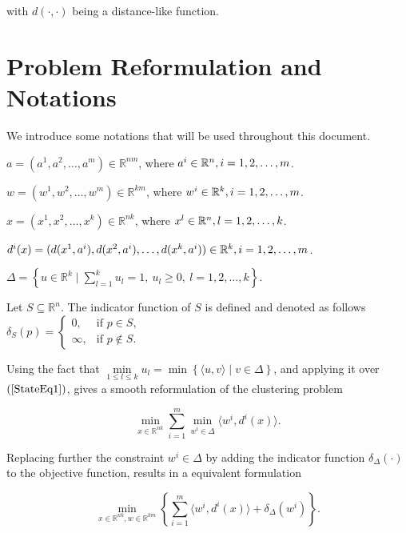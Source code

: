 \documentclass[11pt]{article}
\numberwithin{equation}{section}
\begin{document}
\noindent with $\textit{d}(\cdot ,\cdot)$ being a distance-like function.


\section{Problem Reformulation and Notations}

We introduce some notations that will be used throughout this document.

\noindent $a = (a^1, a^2, \ldots , a^m) \in \mathbb{R}^{nm}$, where $a^i \in \mathbb{R}^n,\smallskip i=1, 2, \ldots , m$.

\noindent $w = (w^1, w^2, \ldots , w^m) \in \mathbb{R}^{km}$, where $w^i \in \mathbb{R}^k,\smallskip i=1, 2, \ldots , m$.

\noindent $x = (x^1, x^2, \ldots , x^k) \in \mathbb{R}^{nk}$, where $x^l \in \mathbb{R}^n,\smallskip l=1, 2, \ldots , k$.

\noindent $d^{i}(x) = (d(x^1,a^i), d(x^2,a^i), \ldots , d(x^k,a^i)) \in \mathbb{R}^k,\smallskip i=1, 2, \ldots , m$.

\noindent $\Delta = \left\lbrace u \in \mathbb{R}^k \mid \sum\limits_{l=1}^{k} u_l = 1, \: u_l \geq 0 , \: l=1, 2, \ldots ,k \right\rbrace$.

\noindent Let $S \subseteq \mathbb{R}^n$. The indicator function of $S$ is defined and denoted as follows $\delta_S(p) = \begin{cases} 0, &\mbox{if } p \in S, \\ 
\infty, &\mbox{if } p \not\in S. \end{cases}$

Using the fact that $\min\limits_{1 \leq l \leq k} u_l = \min \left\lbrace \langle u,v \rangle \mid v \in \Delta \right\rbrace$, and applying it over $\left(\ref{StateEq1}\right)$, gives a smooth reformulation of the clustering problem

\begin{equation}
	\min\limits_{x \in \mathbb{R}^{nk}} \sum\limits_{i=1}^{m} \min\limits_{w^i \in \Delta} \langle w^i , d^i(x) \rangle. \label{StateEq2}
\end{equation}

Replacing further the constraint $w^i \in \Delta$ by adding the indicator function $\delta_{\Delta}(\cdot)$ to the objective function, results in a equivalent formulation

\begin{equation}
	\min\limits_{x \in \mathbb{R}^{nk} , w \in \mathbb{R}^{km}} \left\lbrace \sum\limits_{i=1}^{m} \langle w^i , d^i(x) \rangle + \delta_{\Delta}(w^i) \right\rbrace . \label{StateEq3}
\end{equation}
\end{document}
